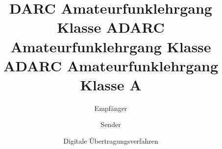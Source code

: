 \documentclass[aspectratio = 169]{beamer}
\begin{document}
\title{DARC Amateurfunklehrgang Klasse A}
\author{Empfänger}
\begin{frame}
\maketitle
\end{frame}



















\title{DARC Amateurfunklehrgang Klasse A}
\author{Sender}
\begin{frame}
\maketitle
\end{frame}










\title{DARC Amateurfunklehrgang Klasse A}
\author{Digitale Übertragungsverfahren}
\begin{frame}
\maketitle
\end{frame}













\end{document}
